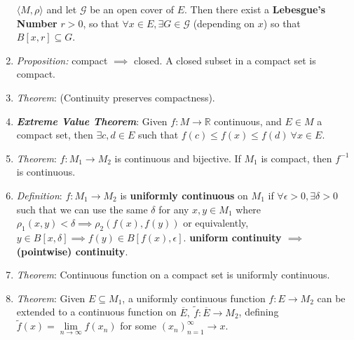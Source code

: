 \documentclass[10pt]{article}
\newcommand{\seqn}[1]{(#1)^\infty_{n=1}}
\newcommand{\real}{\mathbb{R}}
\begin{document}
\begin{multicols*}{3}
\begin{enumerate}
		      \(\langle M,\rho\rangle\) and let \(\mathcal{G}\) be an open cover of \(E\).
		      Then there exist a \textbf{Lebesgue's Number} \(r>0\), so that \(\forall x\in E,
		      \exists G\in\mathcal{G}\) (depending on \(x\)) so that \(B[x,r]\subseteq G\).
		\item \emph{Proposition:} compact \(\implies\) closed. A closed subset in a compact set
		      is compact.
		\item \emph{Theorem}: (Continuity preserves compactness).
		\item \emph{\textbf{Extreme Value Theorem}}: Given $f:M\to\real$ continuous,
		and $E\in M$ a compact set, then $\exists c,d\in E$ such that
		$f(c)\leq f(x)\leq f(d)\ \forall x\in E$.
		\item \emph{Theorem}: $f:M_{1}\to M_{2}$ is continuous and bijective. If
		$M_{1}$ is compact, then $f^{-1}$ is continuous.
		\item \emph{Definition}: $f:M_{1}\to M_{2}$ is \textbf{uniformly continuous}
		on $M_{1}$ if $\forall\epsilon>0,\exists\delta>0$ such that we can use the
		same $\delta$ for any $x,y\in M_{1}$ where
		$\rho_{1}(x,y)<\delta\implies\rho_{2}(f(x),f(y))$ or equivalently,
		$y\in B[x,\delta]\implies f(y)\in B[f(x),\epsilon]$. \textbf{uniform
			continuity $\implies$ (pointwise) continuity}.
		\item \emph{Theorem}: Continuous function on a compact set is uniformly continuous.
		\item \emph{Theorem}: Given $E\subseteq M_{1}$, a uniformly continuous
		function $f:E\to M_{2}$ can be extended to a continuous function on
		$\overline{E},\ \tilde{f}:\overline{E}\to M_{2}$, defining
		$\tilde{f}(x)=\lim\limits_{n\to\infty}f(x_{n})$ for some $\seqn{x_{n}}\to x$.
	\end{enumerate}


\end{multicols*}
\end{document}
